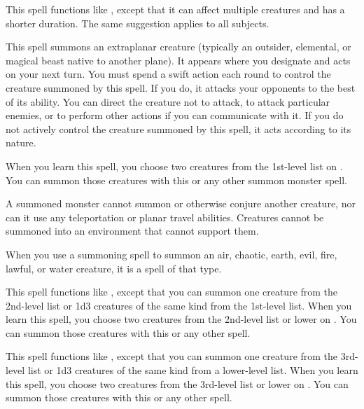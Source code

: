 \spelldur{\durmed}
\spelleffect This spell functions like , except that it can affect multiple creatures and has a shorter duration. The same suggestion applies to all subjects.

\hypertarget{spell:summon monster}{}
\spelldur{\durshort \dismissable}
\spelleffect This spell summons an extraplanar creature (typically an outsider, elemental, or magical beast native to another plane). It appears where you designate and acts on your next turn. You must spend a swift action each round to control the creature summoned by this spell. If you do, it attacks your opponents to the best of its ability. You can direct the creature not to attack, to attack particular enemies, or to perform other actions if you can communicate with it. If you do not actively control the creature summoned by this spell, it acts according to its nature.
\par When you learn this spell, you choose two creatures from the 1st-level list on . You can summon those creatures with this or any other summon monster spell.
\par A summoned monster cannot summon or otherwise conjure another creature, nor can it use any teleportation or planar travel abilities. Creatures cannot be summoned into an environment that cannot support them.
\par When you use a summoning spell to summon an air, chaotic, earth, evil, fire, lawful, or water creature, it is a spell of that type.

\spelleffect This spell functions like , except that you can summon one creature from the 2nd-level list or 1d3 creatures of the same kind from the 1st-level list. When you learn this spell, you choose two creatures from the 2nd-level list or lower on . You can summon those creatures with this or any other  spell.

\spelleffect This spell functions like , except that you can summon one creature from the 3rd-level list or 1d3 creatures of the same kind from a lower-level list. When you learn this spell, you choose two creatures from the 3rd-level list or lower on . You can summon those creatures with this or any other  spell.

